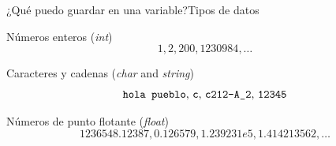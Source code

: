 \documentclass[spanish, handout]{beamer}
\begin{document}
\begin{frame}{¿Qué puedo guardar en una variable?}{Tipos de datos}

    \begin{exampleblock}{Números enteros (\textit{int})}
        $$1, 2, 200, 1230984, \dots$$
    \end{exampleblock} \pause

    \begin{block}{Caracteres y cadenas (\textit{char} and \textit{string})}
        $$\text{\texttt{hola pueblo}, \texttt{c}, \texttt{c212-A\_2}, \texttt{12345}}$$
    \end{block} \pause

    \begin{alertblock}{Números de punto flotante (\textit{float})}
        $$1236548.12387, 0.126579, 1.239231e5, 1.414213562, \dots$$
    \end{alertblock}

\end{frame}



\end{document}
